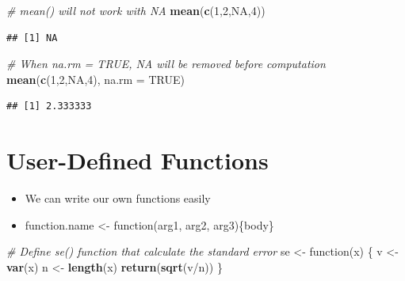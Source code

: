 \documentclass[]{book}
\newenvironment{Shaded}{\begin{snugshade}}{\end{snugshade}}
\newcommand{\KeywordTok}[1]{\textcolor[rgb]{0.13,0.29,0.53}{\textbf{{#1}}}}
\newcommand{\DataTypeTok}[1]{\textcolor[rgb]{0.13,0.29,0.53}{{#1}}}
\newcommand{\DecValTok}[1]{\textcolor[rgb]{0.00,0.00,0.81}{{#1}}}
\newcommand{\StringTok}[1]{\textcolor[rgb]{0.31,0.60,0.02}{{#1}}}
\newcommand{\CommentTok}[1]{\textcolor[rgb]{0.56,0.35,0.01}{\textit{{#1}}}}
\newcommand{\OtherTok}[1]{\textcolor[rgb]{0.56,0.35,0.01}{{#1}}}
\newcommand{\NormalTok}[1]{{#1}}
\providecommand{\tightlist}{%
  \setlength{\itemsep}{0pt}\setlength{\parskip}{0pt}}
\begin{document}
\begin{Shaded}
\begin{Highlighting}[]
\CommentTok{# mean() will not work with NA}
\KeywordTok{mean}\NormalTok{(}\KeywordTok{c}\NormalTok{(}\DecValTok{1}\NormalTok{,}\DecValTok{2}\NormalTok{,}\OtherTok{NA}\NormalTok{,}\DecValTok{4}\NormalTok{))     }
\end{Highlighting}
\end{Shaded}

\begin{verbatim}
## [1] NA
\end{verbatim}

\begin{Shaded}
\begin{Highlighting}[]
\CommentTok{# When na.rm = TRUE, NA will be removed before computation}
\KeywordTok{mean}\NormalTok{(}\KeywordTok{c}\NormalTok{(}\DecValTok{1}\NormalTok{,}\DecValTok{2}\NormalTok{,}\OtherTok{NA}\NormalTok{,}\DecValTok{4}\NormalTok{), }\DataTypeTok{na.rm =} \OtherTok{TRUE}\NormalTok{)    }
\end{Highlighting}
\end{Shaded}

\begin{verbatim}
## [1] 2.333333
\end{verbatim}

\section{User-Defined Functions}\label{user-defined-functions}

\begin{itemize}
\tightlist
\item
  We can write our own functions easily
\item
  function.name \textless{}- function(arg1, arg2, arg3)\{body\}
\end{itemize}

\begin{Shaded}
\begin{Highlighting}[]
\CommentTok{# Define se() function that calculate the standard error}
\NormalTok{se <-}\StringTok{ }\NormalTok{function(x) \{}
  \NormalTok{v <-}\StringTok{ }\KeywordTok{var}\NormalTok{(x)}
  \NormalTok{n <-}\StringTok{ }\KeywordTok{length}\NormalTok{(x)}
  \KeywordTok{return}\NormalTok{(}\KeywordTok{sqrt}\NormalTok{(v/n))}
\NormalTok{\}}
\end{Highlighting}
\end{Shaded}
\end{document}
